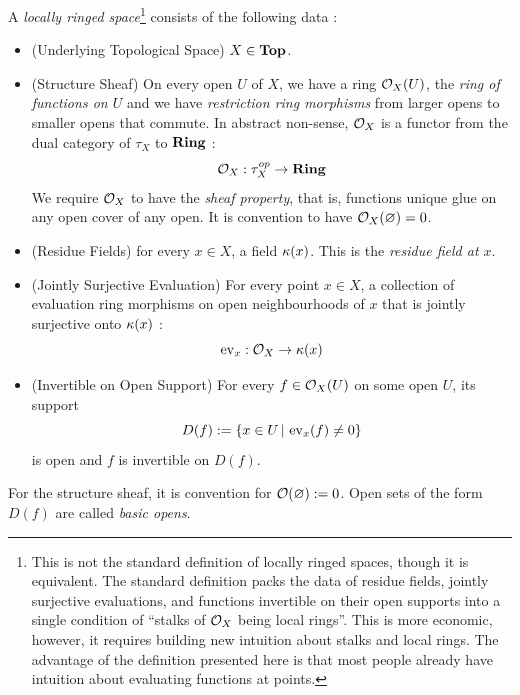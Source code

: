 \begin{dfn}
  
  A \emph{locally ringed space}\footnote{
    This is not the standard definition of locally ringed spaces,
    though it is equivalent. 
    The standard definition packs
    the data of residue fields, jointly surjective evaluations,
    and functions invertible on their open supports into 
    a single condition of ``stalks of $\mathcal{O}_X$ being local rings''.
    This is more economic, however,
    it requires building new intuition about stalks and local rings.
    The advantage of the definition presented here is that 
    most people already have intuition about evaluating functions at points. 
  } consists of the following data : 
  \begin{itemize}
    \item (Underlying Topological Space) $X \in \mathbf{Top}$. 
    \item (Structure Sheaf) 
    On every open $U$ of $X$, we have a ring $\mathcal{O}_X(U)$,
    the \emph{ring of functions on $U$} and 
    we have \emph{restriction ring morphisms} from 
    larger opens to smaller opens that commute. 
    In abstract non-sense, $\mathcal{O}_X$ is a functor from 
    the dual category of $\tau_X$ to $\mathbf{Ring}$ : 
    \[\mathcal{O}_X : \tau_X^{op} \to \mathbf{Ring}\]
    We require $\mathcal{O}_X$ to have the \emph{sheaf property},
    that is, functions unique glue on any open cover of any open.
    It is convention to have $\mathcal{O}_X(\varnothing) = 0$.
    \item (Residue Fields) for every $x \in X$, a field $\kappa(x)$.
    This is the \emph{residue field at $x$}.
    \item (Jointly Surjective Evaluation) For every point $x \in X$, 
    a collection of evaluation ring morphisms on open neighbourhoods of $x$
    that is jointly surjective onto $\kappa(x)$ : 
    \[
      \operatorname{ev}_x : \mathcal{O}_X \to \kappa(x)
    \]
    \item (Invertible on Open Support)
    For every $f \in \mathcal{O}_X(U)$ on some open $U$,
    its support \[
      D(f) := \left\{x \in U \,|\, \operatorname{ev}_x(f) \neq 0\right\}
    \]
    is open and $f$ is invertible on $D(f)$.
  \end{itemize}
  For the structure sheaf, it is convention for $\mathcal{O}(\varnothing) := 0$.
  Open sets of the form $D(f)$ are called \emph{basic opens}.


\end{dfn}
